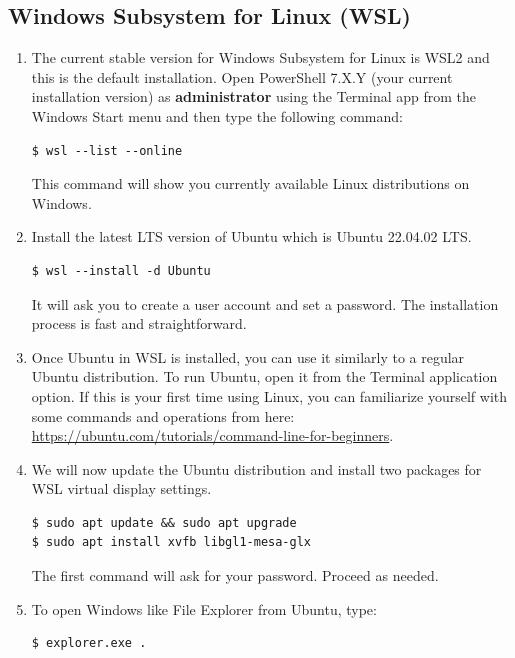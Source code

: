 \documentclass[12pt]{article}
\begin{document}
\subsection*{Windows Subsystem for Linux (WSL)}

\begin{enumerate}[label={\arabic*.}, leftmargin= 0.6 cm,itemsep = 0.25cm,topsep= .25cm]

\item The current stable version for Windows Subsystem for Linux is WSL2 and this is the default installation. Open PowerShell 7.X.Y (your current installation version) as \textbf{administrator} using the Terminal app from the Windows Start menu and then type the following command:
\begin{lstlisting}[style=terminal]
$ wsl --list --online
\end{lstlisting}
This command will show you currently available Linux distributions on Windows. 

\item Install the latest LTS version of Ubuntu which is Ubuntu 22.04.02 LTS.

\begin{lstlisting}[style=terminal]
$ wsl --install -d Ubuntu
\end{lstlisting}
It will ask you to create a user account and set a password. The installation process is fast and straightforward. 

\item Once Ubuntu in WSL is installed, you can use it similarly to a regular Ubuntu distribution. To run Ubuntu, open it from the Terminal application option. If this is your first time using Linux, you can familiarize yourself with some commands and operations from here: \url{https://ubuntu.com/tutorials/command-line-for-beginners}.

\item We will now update the Ubuntu distribution and install two packages for WSL virtual display settings.

\begin{lstlisting}[style=terminal]
$ sudo apt update && sudo apt upgrade
$ sudo apt install xvfb libgl1-mesa-glx
\end{lstlisting}

The first command will ask for your password. Proceed as needed.

\item To open Windows like File Explorer from Ubuntu, type:
\begin{lstlisting}[style=terminal]
$ explorer.exe .
\end{lstlisting}


\end{enumerate}
\end{document}
